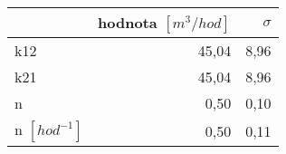 \begin{tabular}{lrr}
\toprule
{} &  hodnota $\left[\si{m^3/hod}\right]$ &  $\sigma$ \\
\midrule
k12                 &                                45,04 &      8,96 \\
k21                 &                                45,04 &      8,96 \\
n                   &                                 0,50 &      0,10 \\
n $[\si{hod^{-1}}]$ &                                 0,50 &      0,11 \\
\bottomrule
\end{tabular}
